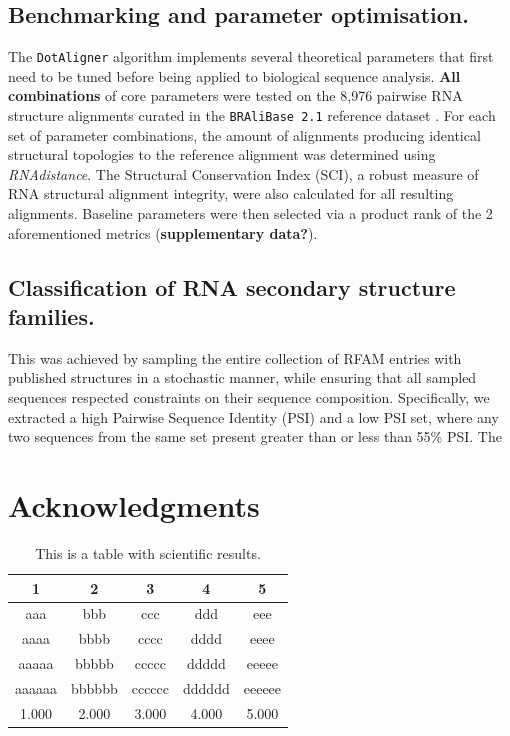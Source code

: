\documentclass[a4paper,11pt]{article}
\newcommand\dotaligner{\texttt{DotAligner}}
\newcommand\bralibase{\texttt{BRAliBase 2.1}}
\begin{document}
\subsection{ Benchmarking and parameter optimisation. }
The \dotaligner{} algorithm implements several theoretical parameters that first need to 
be tuned before being applied to biological sequence analysis.\textbf{ All combinations} of 
core parameters were tested on the 8,976 pairwise RNA structure alignments curated in the 
\bralibase{} reference dataset \cite{Wilm2006enhanced}. For each set of parameter combinations, 
the amount of alignments producing identical structural topologies to the reference alignment
was determined using \textit{RNAdistance}. The Structural Conservation Index (SCI), a robust 
measure of RNA structural alignment integrity, were  also calculated for all resulting alignments. 
Baseline parameters were then selected via a product rank of the 2 aforementioned metrics 
(\textbf{supplementary data?}).\\

\subsection{ Classification of RNA secondary structure families. }
This was achieved by sampling the entire collection of RFAM entries with published structures 
in a stochastic manner, while ensuring that all sampled sequences respected constraints 
on their sequence composition. Specifically, we extracted a high Pairwise Sequence Identity (PSI) 
and a low PSI set, where any two sequences from the same set present greater than or less than 
55\% PSI. The 


 



\section{ Acknowledgments }




\begin{table}
\centering
\caption{This is a table with scientific results.}
\medskip
\begin{tabular}{ccccc}
\hline
1 & 2 & 3 & 4 & 5\\
\hline
aaa & bbb & ccc & ddd & eee\\
aaaa & bbbb & cccc & dddd & eeee\\
aaaaa & bbbbb & ccccc & ddddd & eeeee\\
aaaaaa & bbbbbb & cccccc & dddddd & eeeeee\\
1.000 & 2.000 & 3.000 & 4.000 & 5.000\\
\hline
\end{tabular}
\end{table}
\end{document}
